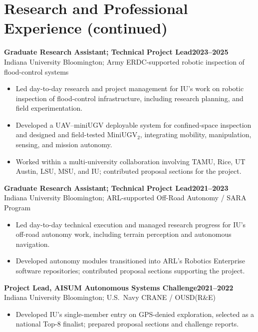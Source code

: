 \documentclass[11pt,letterpaper]{article}
\newcommand{\entry}[3]{
    \Needspace{4\baselineskip}
    \textbf{#1}\hfill\textbf{#2}\\
    #3\par
}
\begin{document}
\newpage


\section{Research and Professional Experience (continued)}

\entry{Graduate Research Assistant; Technical Project Lead}
{2023--2025}
{Indiana University Bloomington;
Army ERDC-supported robotic inspection of flood-control systems}

\begin{itemize}
    \item Led day-to-day research and project management for
    IU's work on robotic inspection of flood-control
    infrastructure, including research planning, and field experimentation.

    \item Developed a UAV--miniUGV deployable system for
    confined-space inspection and designed and field-tested
    MiniUGV$_2$, integrating mobility, manipulation, sensing,
    and mission autonomy.

    \item Worked within a multi-university collaboration
    involving TAMU, Rice, UT Austin, LSU, MSU, and IU;
    contributed proposal sections for the project.
\end{itemize}

\entry{Graduate Research Assistant; Technical Project Lead}
{2021--2023}
{Indiana University Bloomington;
ARL-supported Off-Road Autonomy / SARA Program}

\begin{itemize}
    \item Led day-to-day technical execution and managed
    research progress for IU's off-road autonomy work,
    including terrain perception and autonomous navigation.

    \item Developed autonomy modules transitioned into ARL's
    Robotics Enterprise software repositories; contributed
    proposal sections supporting the project.
\end{itemize}

\entry{Project Lead, AISUM Autonomous Systems Challenge}
{2021--2022}
{Indiana University Bloomington; U.S.\ Navy CRANE / OUSD(R\&E)}

\begin{itemize}
    \item Developed IU's single-member entry on GPS-denied
    exploration, selected as a national Top-8 finalist;
    prepared proposal sections and challenge reports.
\end{itemize}
\end{document}
